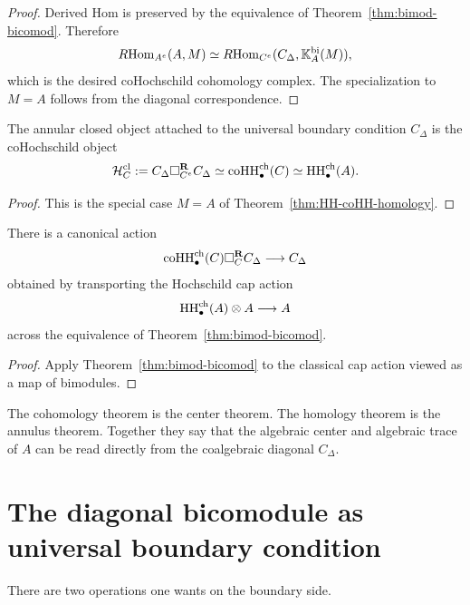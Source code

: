 \begin{proof}
Derived Hom is preserved by the equivalence of Theorem~\ref{thm:bimod-bicomod}. Therefore
\[
R\!\operatorname{Hom}_{A^e}(A,M)\simeq R\!\operatorname{Hom}_{C^e}(C_\Delta,\mathbb{K}_A^{\mathrm{bi}}(M)),
\]
which is the desired coHochschild cohomology complex. The specialization to $M=A$ follows from the
diagonal correspondence.
\end{proof}

\begin{corollary}
The annular closed object attached to the universal boundary condition $C_\Delta$ is the coHochschild
object
\[
\mathcal H_C^{\mathrm{cl}}
:=
C_\Delta \square_{C^e}^{\mathbf R} C_\Delta
\simeq
\operatorname{coHH}^{\mathrm{ch}}_\bullet(C)
\simeq
\operatorname{HH}^{\mathrm{ch}}_\bullet(A).
\]
\end{corollary}

\begin{proof}
This is the special case $M=A$ of Theorem~\ref{thm:HH-coHH-homology}.
\end{proof}

\begin{corollary}
There is a canonical action
\[
\operatorname{coHH}^{\mathrm{ch}}_\bullet(C)\square_C^{\mathbf R} C_\Delta \longrightarrow C_\Delta
\]
obtained by transporting the Hochschild cap action
\[
\operatorname{HH}^{\mathrm{ch}}_\bullet(A)\otimes A\longrightarrow A
\]
across the equivalence of Theorem~\ref{thm:bimod-bicomod}.
\end{corollary}

\begin{proof}
Apply Theorem~\ref{thm:bimod-bicomod} to the classical cap action viewed as a map of bimodules.
\end{proof}

\begin{remark}
The cohomology theorem is the center theorem. The homology theorem is the annulus theorem. Together
they say that the algebraic center and algebraic trace of $A$ can be read directly from the
coalgebraic diagonal $C_\Delta$.
\end{remark}

\section{The diagonal bicomodule as universal boundary condition}

There are two operations one wants on the boundary side.

